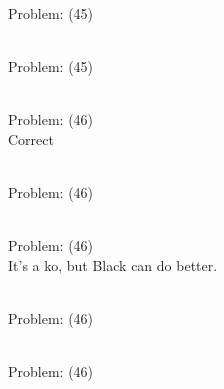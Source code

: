 \documentclass[11pt]{article}
\begin{document}
\begin{minipage}[t]{0.5\textwidth}
  {\centering
  
\\
Problem: (45)\\
  }
\end{minipage}
\begin{minipage}[t]{0.5\textwidth}
  {\centering
  
\\
Problem: (45)\\
  }
\end{minipage}
\begin{minipage}[t]{0.5\textwidth}
  {\centering
  
\\
Problem: (46)\\
Correct\\
  }
\end{minipage}
\begin{minipage}[t]{0.5\textwidth}
  {\centering
  
\\
Problem: (46)\\
  }
\end{minipage}
\begin{minipage}[t]{0.5\textwidth}
  {\centering
  
\\
Problem: (46)\\
It's a ko, but Black can do better.\\
  }
\end{minipage}
\begin{minipage}[t]{0.5\textwidth}
  {\centering
  
\\
Problem: (46)\\
  }
\end{minipage}
\begin{minipage}[t]{0.5\textwidth}
  {\centering
  
\\
Problem: (46)\\
  }
\end{minipage}
\end{document}
